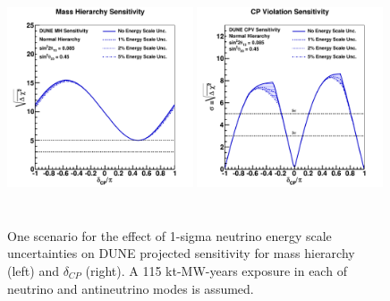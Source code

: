 \begin{figure}[h!]
\centering
\includegraphics[width=0.49\textwidth,height=6.7cm]{figures/mh_230ktmwyear_varyesyst}
\includegraphics[width=0.49\textwidth,height=6.7cm]{figures/cpv_890ktmwyear_varyesyst}
\label{fig:global_escale_sens}
  \caption{One scenario for the effect of 1-sigma  neutrino energy scale uncertainties on
DUNE projected sensitivity for mass hierarchy (left) and $\delta_{CP}$ 
(right).
A 115 kt-MW-years exposure in each of neutrino and antineutrino modes is assumed.
}
\end{figure}





